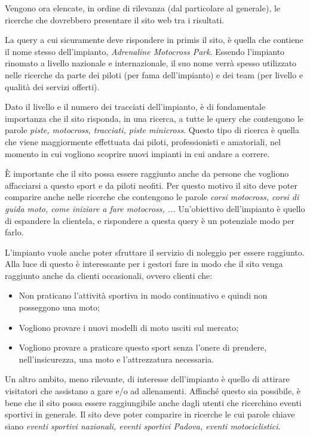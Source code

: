 Vengono ora elencate, in ordine di rilevanza (dal particolare al generale), le ricerche che dovrebbero presentare il sito web tra i risultati.

La query a cui sicuramente deve rispondere in primis il sito, è quella che contiene il nome stesso dell'impianto, \textit{Adrenaline Motocross Park}. Essendo l'impianto rinomato a livello nazionale e internazionale, il suo nome verrà spesso utilizzato nelle ricerche da parte dei piloti (per fama dell'impianto) e dei team (per livello e qualità dei servizi offerti).

Dato il livello e il numero dei tracciati dell'impianto, è di fondamentale importanza che il sito risponda, in una ricerca, a tutte le query che contengono le parole \textit{piste, motocross, tracciati, piste minicross}. Questo tipo di ricerca è quella che viene maggiormente effettuata dai piloti, professionisti e amatoriali, nel momento in cui vogliono scoprire nuovi impianti in cui andare a correre.

È importante che il sito possa essere raggiunto anche da persone che vogliono affacciarsi a questo sport e da piloti neofiti. Per questo motivo il sito deve poter comparire anche nelle ricerche che contengono le parole \textit{corsi motocross, corsi di guida moto, come iniziare a fare motocross, ...} Un'obiettivo dell'impianto è quello di espandere la clientela, e rispondere a questa query è un potenziale modo per farlo.

L'impianto vuole anche poter sfruttare il servizio di noleggio per essere raggiunto. Alla luce di questo è interessante per i gestori fare in modo che il sito venga raggiunto anche da clienti occasionali, ovvero clienti che:
\begin{itemize}
\item Non praticano l'attività sportiva in modo continuativo e quindi non posseggono una moto;
\item Vogliono provare i nuovi modelli di moto usciti sul mercato;
\item Vogliono provare a praticare questo sport senza l'onere di prendere, nell'insicurezza, una moto e l'attrezzatura necessaria.
\end{itemize}

Un altro ambito, meno rilevante, di interesse dell'impianto è quello di attirare visitatori che assistano a gare e/o ad allenamenti. Affinché questo sia possibile, è bene che il sito possa essere raggiungibile anche dagli utenti che ricerchino eventi sportivi in generale. Il sito deve poter comparire in ricerche le cui parole chiave siano \textit{eventi sportivi nazionali, eventi sportivi Padova, eventi motociclistici}.

